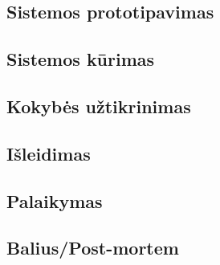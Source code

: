 \documentclass{VUMIFPSkursinis}
\begin{document}
	\subsection{Sistemos prototipavimas}
	\subsection{Sistemos kūrimas}
	\subsection{Kokybės užtikrinimas}
	\subsection{Išleidimas}
	\subsection{Palaikymas}
	\subsection{Balius/Post-mortem}
	



\end{document}
